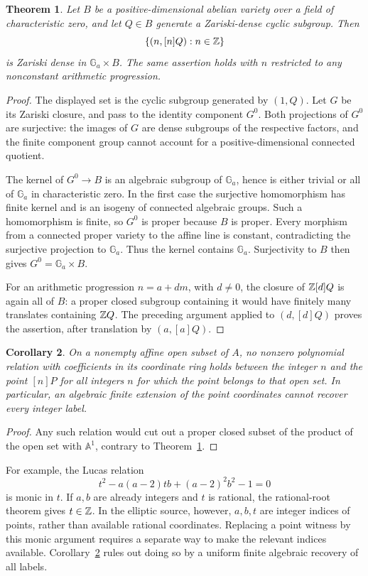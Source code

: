 \documentclass[11pt,a4paper]{article}
\newtheorem{theorem}{Theorem}[section]
\newtheorem{corollary}[theorem]{Corollary}
\theoremstyle{remark}\newtheorem{remark}[theorem]{Remark}
\newcommand{\Ga}{\mathbb G_a}\newcommand{\Aa}{\mathbb A}
\begin{document}
\begin{theorem}\label{thm:index-graph}
Let $B$ be a positive-dimensional abelian variety over a field of
characteristic zero, and let $Q\in B$ generate a Zariski-dense
cyclic subgroup.  Then
\[
             \{(n,[n]Q):n\in\mathbb Z\}
\]
is Zariski dense in $\Ga\times B$.
The same assertion holds with $n$ restricted to any nonconstant
arithmetic progression.
\end{theorem}
\begin{proof}
The displayed set is the cyclic subgroup generated by $(1,Q)$.
Let $G$ be its Zariski closure, and pass to the identity component
$G^0$.  Both projections of $G^0$ are surjective: the images of
$G$ are dense subgroups of the respective factors, and the finite
component group cannot account for a positive-dimensional connected
quotient.

The kernel of $G^0\to B$ is an algebraic subgroup of $\Ga$, hence
is either trivial or all of $\Ga$ in characteristic zero.  In the
first case the surjective homomorphism has finite kernel and is
an isogeny of connected algebraic groups.  Such a homomorphism is
finite, so $G^0$ is proper because $B$ is proper.  Every morphism
from a connected proper variety to the affine line is constant,
contradicting the surjective projection to $\Ga$.  Thus the kernel
contains $\Ga$.  Surjectivity to $B$ then gives
$G^0=\Ga\times B$.

For an arithmetic progression $n=a+dm$, with $d\ne0$, the closure
of $\mathbb Z[d]Q$ is again all of $B$: a proper closed subgroup containing
it would have finitely many translates containing $\mathbb Z Q$.
The preceding argument applied to $(d,[d]Q)$ proves the assertion,
after translation by $(a,[a]Q)$.
\end{proof}

\begin{corollary}\label{cor:no-index}
On a nonempty affine open subset of $A$, no nonzero polynomial
relation with coefficients in its coordinate ring holds between
the integer $n$ and the point $[n]P$ for all integers $n$ for which
the point belongs to that open set.  In particular, an algebraic
finite extension of the point coordinates cannot recover every
integer label.
\end{corollary}
\begin{proof}
Any such relation would cut out a proper closed subset of the
product of the open set with $\Aa^1$, contrary to
Theorem~\ref{thm:index-graph}.
\end{proof}

For example, the Lucas relation
\[
 t^2-a(a-2)tb+(a-2)^2b^2-1=0
\]
is monic in $t$.  If $a,b$ are already integers and $t$ is rational,
the rational-root theorem gives $t\in\mathbb Z$.  In the elliptic source,
however, $a,b,t$ are integer indices of points, rather than
available rational coordinates.  Replacing a point witness by this
monic argument requires a separate way to make the relevant
indices available.  Corollary~\ref{cor:no-index} rules out doing so
by a uniform finite algebraic recovery of all labels.
\end{document}
